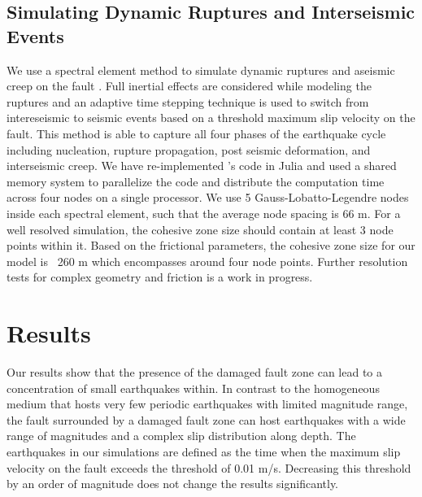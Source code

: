 \documentclass[11pt]{article}
\begin{document}
\subsection{Simulating Dynamic Ruptures and Interseismic Events}
We use a spectral element method to simulate dynamic ruptures and aseismic creep on the fault \citep{kaneko_2011}. Full inertial effects are considered while modeling the ruptures and an adaptive time stepping technique is used to switch from intereseismic to seismic events based on a threshold maximum slip velocity on the fault. This method is able to capture all four phases of the earthquake cycle including nucleation, rupture propagation, post seismic deformation, and interseismic creep.  We have re-implemented \citep{kaneko_2011}'s code in Julia \citep{bezanson_2017} and used a shared memory system to parallelize the code and distribute the computation time across four nodes on a single processor. We use 5 Gauss-Lobatto-Legendre nodes inside each spectral element, such that the average node spacing is 66 m. For a well resolved simulation, the cohesive zone size \citep{rubin_ampuero_2005,kaneko_2011} should contain at least 3 node points within it. Based on the frictional parameters, the cohesive zone size for our model is ~260 m which encompasses around four node points. Further resolution tests for complex geometry and friction is a work in progress.

\section{Results}
Our results show that the presence of the damaged fault zone can lead to a concentration of small earthquakes within. In contrast to the homogeneous medium that hosts very few periodic earthquakes with limited magnitude range, the fault surrounded by a damaged fault zone can host earthquakes with a wide range of magnitudes and a complex slip distribution along depth. The earthquakes in our simulations are defined as the time when the maximum slip velocity on the fault exceeds the threshold of 0.01 m/s. Decreasing this threshold by an order of magnitude does not change the results significantly.
\end{document}
